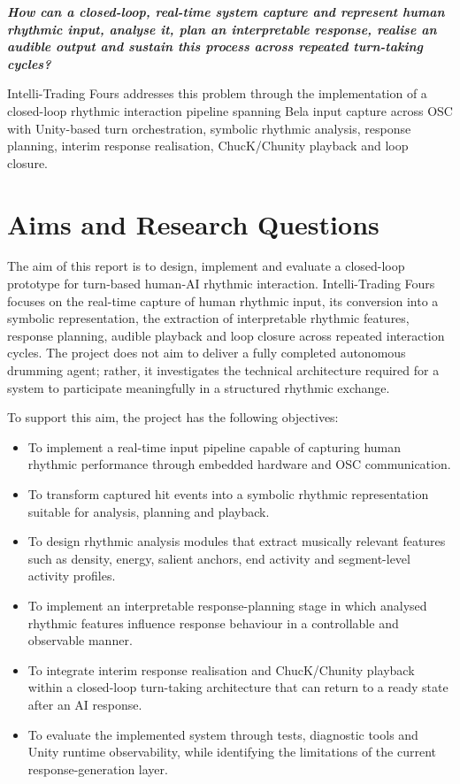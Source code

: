 \emph{\textbf{How can a closed-loop, real-time system capture and
represent human rhythmic input, analyse it, plan an interpretable
response, realise an audible output and sustain this process across
repeated turn-taking cycles?}}

Intelli-Trading Fours addresses this problem through the implementation
of a closed-loop rhythmic interaction pipeline spanning Bela input
capture across OSC with Unity-based turn orchestration, symbolic
rhythmic analysis, response planning, interim response realisation,
ChucK/Chunity playback and loop closure.

\section{Aims and Research Questions}\label{aims-and-research-questions}

The aim of this report is to design, implement and evaluate a
closed-loop prototype for turn-based human-AI rhythmic interaction.
Intelli-Trading Fours focuses on the real-time capture of human rhythmic
input, its conversion into a symbolic representation, the extraction of
interpretable rhythmic features, response planning, audible playback and
loop closure across repeated interaction cycles. The project does not
aim to deliver a fully completed autonomous drumming agent; rather, it
investigates the technical architecture required for a system to
participate meaningfully in a structured rhythmic exchange.

To support this aim, the project has the following objectives:

\begin{itemize}
\item
  To implement a real-time input pipeline capable of capturing human
  rhythmic performance through embedded hardware and OSC communication.
\item
  To transform captured hit events into a symbolic rhythmic
  representation suitable for analysis, planning and playback.
\item
  To design rhythmic analysis modules that extract musically relevant
  features such as density, energy, salient anchors, end activity and
  segment-level activity profiles.
\item
  To implement an interpretable response-planning stage in which
  analysed rhythmic features influence response behaviour in a
  controllable and observable manner.
\item
  To integrate interim response realisation and ChucK/Chunity playback
  within a closed-loop turn-taking architecture that can return to a
  ready state after an AI response.
\item
  To evaluate the implemented system through tests, diagnostic tools and
  Unity runtime observability, while identifying the limitations of the
  current response-generation layer.
\end{itemize}

